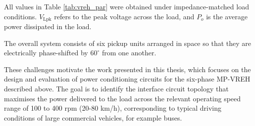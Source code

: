 All values in Table \ref{tab:vreh_par} were obtained under
impedance-matched load conditions. $V_\text{Lpk}$ refers to
the peak voltage across the load, and $P_o$ is the average
power dissipated in the load.

The overall system consists of six pickup units arranged
in space so that they are electrically phase-shifted by
$60^\circ$ from one another.

These challenges motivate the work presented in this
thesis, which focuses on the design and evaluation of
power conditioning circuits for the six-phase MP-VREH
described above. The goal is to identify the interface
circuit topology that maximises the power delivered to
the load across the relevant operating speed range of
100 to 400 rpm (20-80 km/h), corresponding to typical driving
conditions of large commercial vehicles, for example buses.